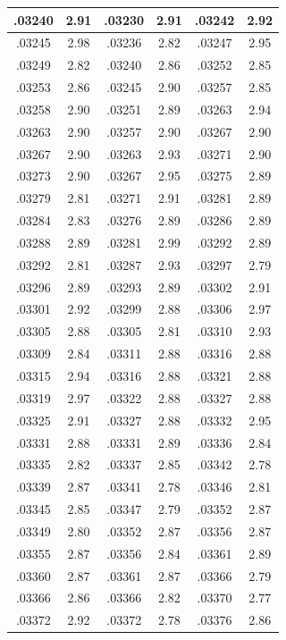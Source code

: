 \documentclass[10pt,twoside]{report}
\begin{document}
\begin{appendices}
\begin{longtable}{|c|c||c|c||c|c|}
.03240 & 2.91 & .03230 & 2.91 & .03242 & 2.92\\\hline
.03245 & 2.98 & .03236 & 2.82 & .03247 & 2.95\\\hline
.03249 & 2.82 & .03240 & 2.86 & .03252 & 2.85\\\hline
.03253 & 2.86 & .03245 & 2.90 & .03257 & 2.85\\\hline
.03258 & 2.90 & .03251 & 2.89 & .03263 & 2.94\\\hline
.03263 & 2.90 & .03257 & 2.90 & .03267 & 2.90\\\hline
.03267 & 2.90 & .03263 & 2.93 & .03271 & 2.90\\\hline
.03273 & 2.90 & .03267 & 2.95 & .03275 & 2.89\\\hline
.03279 & 2.81 & .03271 & 2.91 & .03281 & 2.89\\\hline
.03284 & 2.83 & .03276 & 2.89 & .03286 & 2.89\\\hline
.03288 & 2.89 & .03281 & 2.99 & .03292 & 2.89\\\hline
.03292 & 2.81 & .03287 & 2.93 & .03297 & 2.79\\\hline
.03296 & 2.89 & .03293 & 2.89 & .03302 & 2.91\\\hline
.03301 & 2.92 & .03299 & 2.88 & .03306 & 2.97\\\hline
.03305 & 2.88 & .03305 & 2.81 & .03310 & 2.93\\\hline
.03309 & 2.84 & .03311 & 2.88 & .03316 & 2.88\\\hline
.03315 & 2.94 & .03316 & 2.88 & .03321 & 2.88\\\hline
.03319 & 2.97 & .03322 & 2.88 & .03327 & 2.88\\\hline
.03325 & 2.91 & .03327 & 2.88 & .03332 & 2.95\\\hline
.03331 & 2.88 & .03331 & 2.89 & .03336 & 2.84\\\hline
.03335 & 2.82 & .03337 & 2.85 & .03342 & 2.78\\\hline
.03339 & 2.87 & .03341 & 2.78 & .03346 & 2.81\\\hline
.03345 & 2.85 & .03347 & 2.79 & .03352 & 2.87\\\hline
.03349 & 2.80 & .03352 & 2.87 & .03356 & 2.87\\\hline
.03355 & 2.87 & .03356 & 2.84 & .03361 & 2.89\\\hline
.03360 & 2.87 & .03361 & 2.87 & .03366 & 2.79\\\hline
.03366 & 2.86 & .03366 & 2.82 & .03370 & 2.77\\\hline
.03372 & 2.92 & .03372 & 2.78 & .03376 & 2.86\\\hline

\end{longtable}
\end{appendices}
\end{document}
